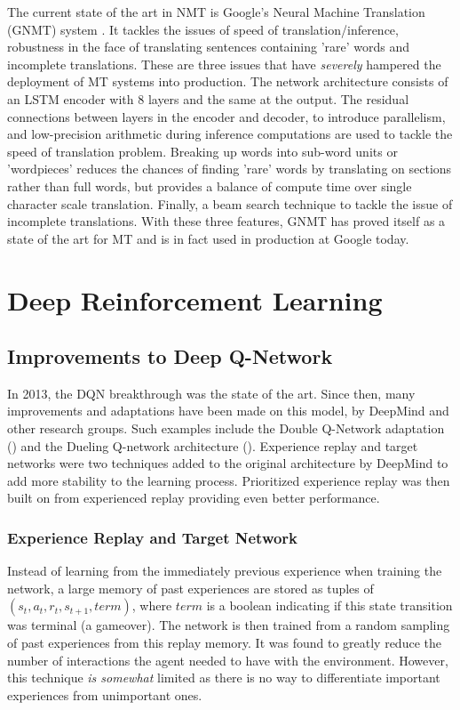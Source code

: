 The current state of the art in NMT is Google's Neural Machine Translation (GNMT) system \cite{wu2016google}. It tackles the issues of speed of translation/inference, robustness in the face of translating sentences containing 'rare' words and incomplete translations. These are three issues that have \textit{severely} hampered the deployment of MT systems into production. The network architecture consists of an LSTM encoder with 8 layers and the same at the output. The residual connections between layers in the encoder and decoder, to introduce parallelism, and low-precision arithmetic during inference computations are used to tackle the speed of translation problem. Breaking up words into sub-word units or 'wordpieces' reduces the chances of finding 'rare' words by translating on sections rather than full words, but provides a balance of compute time over single character scale translation. Finally, a beam search technique to tackle the issue of incomplete translations. With these three features, GNMT has proved itself as a state of the art for MT and is in fact used in production at Google today.

\section{Deep Reinforcement Learning}
\subsection{Improvements to Deep Q-Network}
In 2013, the DQN breakthrough was the state of the art. Since then, many improvements and adaptations have been made on this model, by DeepMind and other research groups. Such examples include the Double Q-Network adaptation (\cite{doubleq}) and the Dueling Q-network architecture (\cite{dueling}). Experience replay and target networks were two techniques added to the original architecture by DeepMind to add more stability to the learning process. Prioritized experience replay was then built on from experienced replay providing even better performance.

\subsubsection{Experience Replay and Target Network}
Instead of learning from the immediately previous experience when training the network, a large memory of past experiences are stored as tuples of $(s_t, a_t, r_{t}, s_{t+1}, term)$, where $term$ is a boolean indicating if this state transition was terminal (a gameover). The network is then trained from a random sampling of past experiences from this replay memory. It was found to greatly reduce the number of interactions the agent needed to have with the environment. However, this technique \textit{is somewhat} limited as there is no way to differentiate important experiences from unimportant ones. \paragraph{}

